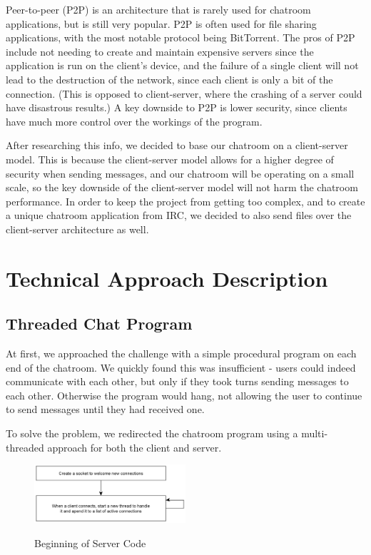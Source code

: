 \documentclass{article}
\begin{document}
Peer-to-peer (P2P) is an architecture that is rarely used for chatroom applications, but is still very popular. P2P is often used for file sharing applications, with the most notable protocol being BitTorrent. The pros of P2P include not needing to create and maintain expensive servers since the application is run on the client's device, and the failure of a single client will not lead to the destruction of the network, since each client is only a bit of the connection. (This is opposed to client-server, where the crashing of a server could have disastrous results.) A key downside to P2P is lower security, since clients have much more control over the workings of the program.

After researching this info, we decided to base our chatroom on a client-server model. This is because the client-server model allows for a higher degree of security when sending messages, and our chatroom will be operating on a small scale, so the key downside of the client-server model will not harm the chatroom performance. In order to keep the project from getting too complex, and to create a unique chatroom application from IRC, we decided to also send files over the client-server architecture as well.

\section{Technical Approach Description}

\subsection{Threaded Chat Program}

At first, we approached the challenge with a simple procedural program on each end of the chatroom. We quickly found this was insufficient - users could indeed communicate with each other, but only if they took turns sending messages to each other. Otherwise the program would hang, not allowing the user to continue to send messages until they had received one.

To solve the problem, we redirected the chatroom program using a multi-threaded approach for both the client and server.

\begin{figure}[h]
\caption{Beginning of Server Code}
\centering
\includegraphics[width=0.5\textwidth]{media/serverFlowchart2.png}
\label{server2}
\end{figure}
\end{document}
